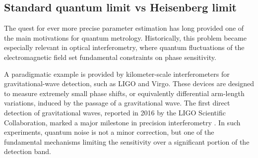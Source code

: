 \subsection{Standard quantum limit vs Heisenberg limit}
\label{subsec:sql_hl}

The quest for ever more precise parameter estimation has long provided one of the main motivations for quantum metrology. Historically, this problem became especially relevant in optical interferometry, where quantum fluctuations of the electromagnetic field set fundamental constraints on phase sensitivity.

A paradigmatic example is provided by kilometer-scale interferometers for gravitational-wave detection, such as LIGO and Virgo. These devices are designed to measure extremely small phase shifts, or equivalently differential arm-length variations, induced by the passage of a gravitational wave. The first direct detection of gravitational waves, reported in 2016 by the LIGO Scientific Collaboration, marked a major milestone in precision interferometry \cite{Abb16}. In such experiments, quantum noise is not a minor correction, but one of the fundamental mechanisms limiting the sensitivity over a significant portion of the detection band.

